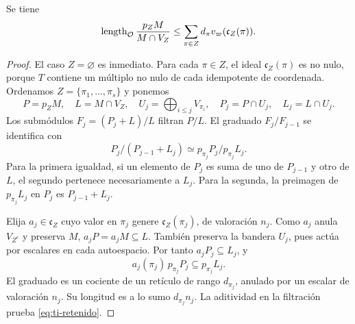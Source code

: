 \begin{proposicion}
\label{prop:ti-retenido}
Se tiene
\begin{equation}
 \operatorname{length}_{\mathcal O}\frac{p_ZM}{M\cap V_Z}
 \le\sum_{\pi\in Z}d_\pi v_\varpi(\mathfrak c_Z(\pi)).
 \label{eq:ti-retenido}
\end{equation}
\end{proposicion}
\begin{proof}
El caso $Z=\varnothing$ es inmediato. Para cada $\pi\in Z$,
el ideal $\mathfrak c_Z(\pi)$ es no nulo, porque $T$ contiene
un múltiplo no nulo de cada idempotente de coordenada.
Ordenamos $Z=\{\pi_1,\ldots,\pi_s\}$ y ponemos
\[
 P=p_ZM,\quad L=M\cap V_Z,\quad
 U_j=\bigoplus_{i\le j}V_{\pi_i},\quad
 P_j=P\cap U_j,\quad L_j=L\cap U_j.
\]
Los submódulos $F_j=(P_j+L)/L$ filtran $P/L$.
El graduado $F_j/F_{j-1}$ se identifica con
\[
 P_j/(P_{j-1}+L_j)\simeq p_{\pi_j}P_j/p_{\pi_j}L_j.
\]
Para la primera igualdad, si un elemento de $P_j$ es suma
 de uno de $P_{j-1}$ y otro de $L$, el segundo pertenece
necesariamente a $L_j$. Para la segunda, la preimagen de
$p_{\pi_j}L_j$ en $P_j$ es $P_{j-1}+L_j$.

Elija $a_j\in\mathfrak c_Z$ cuyo valor en $\pi_j$ genere
$\mathfrak c_Z(\pi_j)$, de valoración $n_j$.
Como $a_j$ anula $V_{Z^c}$ y preserva $M$,
$a_jP=a_jM\subseteq L$.
También preserva la bandera $U_j$, pues actúa por escalares
en cada autoespacio. Por tanto $a_jP_j\subseteq L_j$, y
\[
 a_j(\pi_j)\,p_{\pi_j}P_j\subseteq p_{\pi_j}L_j.
\]
El graduado es un cociente de un retículo de rango $d_{\pi_j}$,
anulado por un escalar de valoración $n_j$. Su longitud
es a lo sumo $d_{\pi_j}n_j$. La aditividad en la filtración
prueba \eqref{eq:ti-retenido}.
\end{proof}

